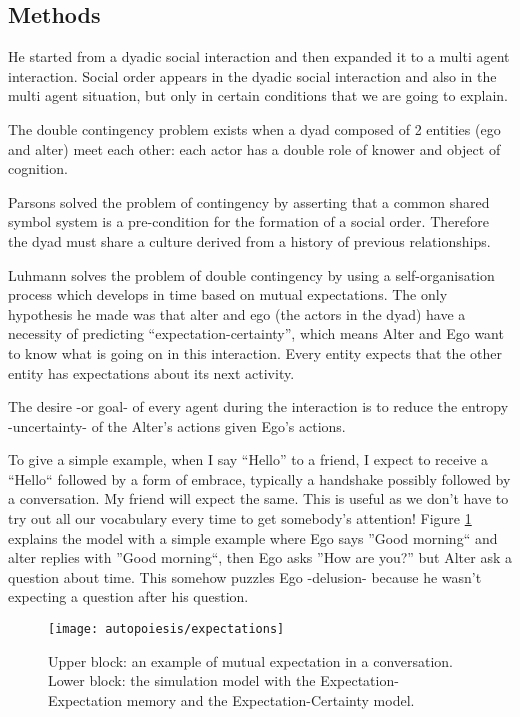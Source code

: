 \subsection{Methods}
He started from a dyadic social interaction and then expanded it to a multi agent interaction.
Social order appears in the dyadic social interaction and also in the multi agent situation,
but only in certain conditions that we are going to explain.

The double contingency problem exists when a dyad composed of 2 entities (ego and alter) meet each other:
each actor has a double role of knower and object of cognition.

Parsons solved the problem of contingency by asserting that a common shared symbol system
is a pre-condition for the formation of a social order.
Therefore the dyad must share a culture derived from a history of previous relationships.

Luhmann solves the problem of double contingency by using a self-organisation process which
develops in time based on mutual expectations.
The only hypothesis he made was that alter and ego (the actors in the dyad) have a
necessity of predicting ``expectation-certainty'', which means Alter and Ego want to know what
is going on in this interaction.
Every entity expects that the other entity has expectations about its next activity.

The desire -or goal- of every agent during the interaction is to reduce the entropy -uncertainty- of the
Alter's actions given Ego's actions.

To give a simple example, when I say ``Hello'' to a friend, I expect to receive a ``Hello`` followed by
a form of embrace, typically a handshake possibly followed by a conversation. My friend will expect the same.
This is useful as we don't have to try out all our vocabulary every time to get somebody's attention!
Figure \ref{Fig:Dittrich:Model} explains the model with a simple example where
Ego says ''Good morning`` and alter replies with ''Good morning``, then Ego
asks ''How are you?'' but Alter ask a question about time.
This somehow puzzles Ego -delusion- because he wasn't expecting a question after
his question.
\begin{figure}[htbp]
\begin{center}
\texttt{[image: autopoiesis/expectations]}
\end{center}
\small{
\caption[Expectations and communication structures]{
Upper block: an example of mutual expectation in a conversation.
Lower block: the simulation model with the Expectation-Expectation memory
and the Expectation-Certainty model.
\label{Fig:Dittrich:Model}}}
\end{figure}

